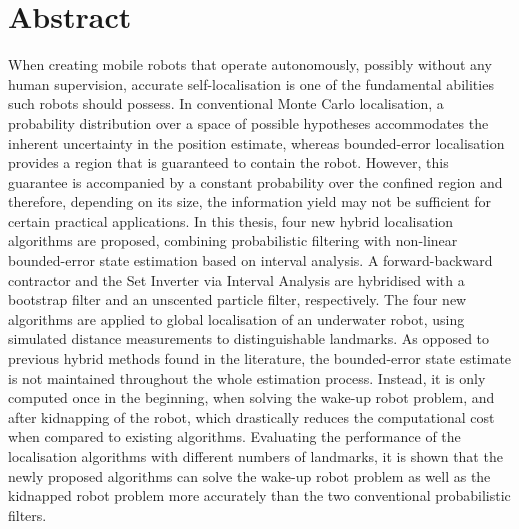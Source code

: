 
\begingroup
\let\clearpage\relax
\let\cleardoublepage\relax
\let\cleardoublepage\relax

\chapter*{Abstract}

When creating mobile robots that operate autonomously, possibly without any human supervision, accurate self-localisation is one of the fundamental abilities such robots should possess. In conventional Monte Carlo localisation, a probability distribution over a space of possible hypotheses accommodates the inherent uncertainty in the position estimate, whereas bounded-error localisation provides a region that is guaranteed to contain the robot. However, this guarantee is accompanied by a constant probability over the confined region and therefore, depending on its size, the information yield may not be sufficient for certain practical applications. In this thesis, four new hybrid localisation algorithms are proposed, combining probabilistic filtering with non-linear bounded-error state estimation based on interval analysis. A forward-backward contractor and the Set Inverter via Interval Analysis are hybridised with a bootstrap filter and an unscented particle filter, respectively. The four new algorithms are applied to global localisation of an underwater robot, using simulated distance measurements to distinguishable landmarks. As opposed to previous hybrid methods found in the literature, the bounded-error state estimate is not maintained throughout the whole estimation process. Instead, it is only computed once in the beginning, when solving the wake-up robot problem, and after kidnapping of the robot, which drastically reduces the computational cost when compared to existing algorithms. Evaluating the performance of the localisation algorithms with different numbers of landmarks, it is shown that the newly proposed algorithms can solve the wake-up robot problem as well as the kidnapped robot problem more accurately than the two conventional probabilistic filters.

\vfill

\endgroup			

\vfill